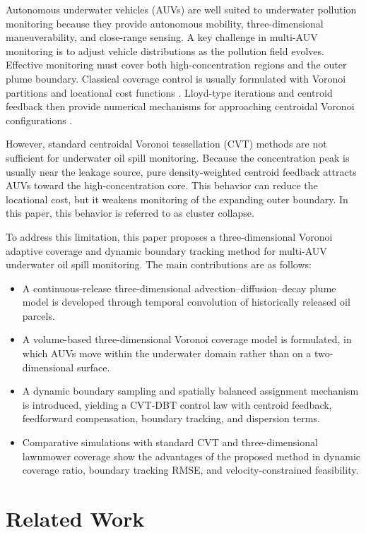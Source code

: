 \documentclass[conference]{IEEEtran}
\begin{document}
Autonomous underwater vehicles (AUVs) are well suited to underwater pollution monitoring because they provide autonomous mobility, three-dimensional maneuverability, and close-range sensing. A key challenge in multi-AUV monitoring is to adjust vehicle distributions as the pollution field evolves. Effective monitoring must cover both high-concentration regions and the outer plume boundary. Classical coverage control is usually formulated with Voronoi partitions and locational cost functions \cite{cortes2004coverage}. Lloyd-type iterations and centroid feedback then provide numerical mechanisms for approaching centroidal Voronoi configurations \cite{du2006lloyd}.

However, standard centroidal Voronoi tessellation (CVT) methods are not sufficient for underwater oil spill monitoring. Because the concentration peak is usually near the leakage source, pure density-weighted centroid feedback attracts AUVs toward the high-concentration core. This behavior can reduce the locational cost, but it weakens monitoring of the expanding outer boundary. In this paper, this behavior is referred to as cluster collapse.

To address this limitation, this paper proposes a three-dimensional Voronoi adaptive coverage and dynamic boundary tracking method for multi-AUV underwater oil spill monitoring. The main contributions are as follows:
\begin{itemize}
\item A continuous-release three-dimensional advection--diffusion--decay plume model is developed through temporal convolution of historically released oil parcels.
\item A volume-based three-dimensional Voronoi coverage model is formulated, in which AUVs move within the underwater domain rather than on a two-dimensional surface.
\item A dynamic boundary sampling and spatially balanced assignment mechanism is introduced, yielding a CVT-DBT control law with centroid feedback, feedforward compensation, boundary tracking, and dispersion terms.
\item Comparative simulations with standard CVT and three-dimensional lawnmower coverage show the advantages of the proposed method in dynamic coverage ratio, boundary tracking RMSE, and velocity-constrained feasibility.
\end{itemize}

\section{Related Work}
\end{document}
